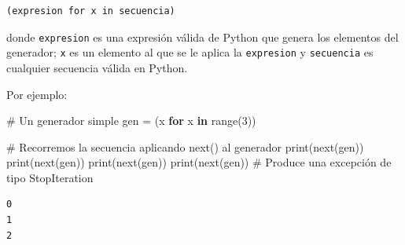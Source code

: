 \documentclass[
  spanish,
  letterpaper,
]{scrbook}
\newenvironment{Shaded}{\begin{snugshade}}{\end{snugshade}}
\newcommand{\BuiltInTok}[1]{\textcolor[rgb]{0.00,0.23,0.31}{#1}}
\newcommand{\CommentTok}[1]{\textcolor[rgb]{0.37,0.37,0.37}{#1}}
\newcommand{\ControlFlowTok}[1]{\textcolor[rgb]{0.00,0.23,0.31}{\textbf{#1}}}
\newcommand{\DecValTok}[1]{\textcolor[rgb]{0.68,0.00,0.00}{#1}}
\newcommand{\KeywordTok}[1]{\textcolor[rgb]{0.00,0.23,0.31}{\textbf{#1}}}
\newcommand{\NormalTok}[1]{\textcolor[rgb]{0.00,0.23,0.31}{#1}}
\newcommand{\OperatorTok}[1]{\textcolor[rgb]{0.37,0.37,0.37}{#1}}
\theoremstyle{definition}
\theoremstyle{remark}
\begin{document}
\begin{verbatim}
(expresion for x in secuencia)
\end{verbatim}

donde \texttt{expresion} es una expresión válida de Python que genera
los elementos del generador; \texttt{x} es un elemento al que se le
aplica la \texttt{expresion} y \texttt{secuencia} es cualquier secuencia
válida en Python.

Por ejemplo:

\begin{Shaded}
\begin{Highlighting}[]
\CommentTok{\# Un generador simple}
\NormalTok{gen }\OperatorTok{=}\NormalTok{ (x }\ControlFlowTok{for}\NormalTok{ x }\KeywordTok{in} \BuiltInTok{range}\NormalTok{(}\DecValTok{3}\NormalTok{))}
\end{Highlighting}
\end{Shaded}

\begin{Shaded}
\begin{Highlighting}[]
\CommentTok{\# Recorremos la secuencia aplicando next() al generador}
\BuiltInTok{print}\NormalTok{(}\BuiltInTok{next}\NormalTok{(gen))}
\BuiltInTok{print}\NormalTok{(}\BuiltInTok{next}\NormalTok{(gen))}
\BuiltInTok{print}\NormalTok{(}\BuiltInTok{next}\NormalTok{(gen))}
\BuiltInTok{print}\NormalTok{(}\BuiltInTok{next}\NormalTok{(gen)) }\CommentTok{\# Produce una excepción de tipo StopIteration}
\end{Highlighting}
\end{Shaded}

\begin{verbatim}
0
1
2
\end{verbatim}
\end{document}
